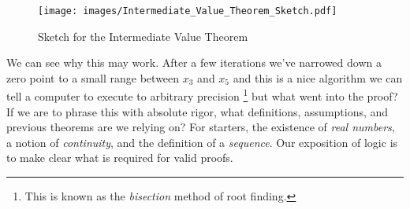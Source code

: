     \begin{figure}[H]
        \centering
        \captionsetup{type=figure}
        \if{}
            \texttt{[image: images/Intermediate\_Value\_Theorem\_Sketch.pdf]}
        \fi
        \caption{Sketch for the Intermediate Value Theorem}
        \label{fig:Sketch_of_IVP}
    \end{figure}
    We can see why this may work. After a few iterations we've narrowed down a
    zero point to a small range between $x_{3}$ and $x_{5}$ and this is a
    nice algorithm we can tell a computer to execute to arbitrary precision%
    \footnote{%
        This is known as the \textit{bisection} method%
         of root finding.%
    }
    but what went into the proof? If we are to phrase this with absolute rigor,
    what definitions, assumptions, and previous theorems are we relying on? For
    starters, the existence of \textit{real numbers}, a notion of
    \textit{continuity}, and the definition of a \textit{sequence}. Our
    exposition of logic is to make clear what is required for valid proofs.
